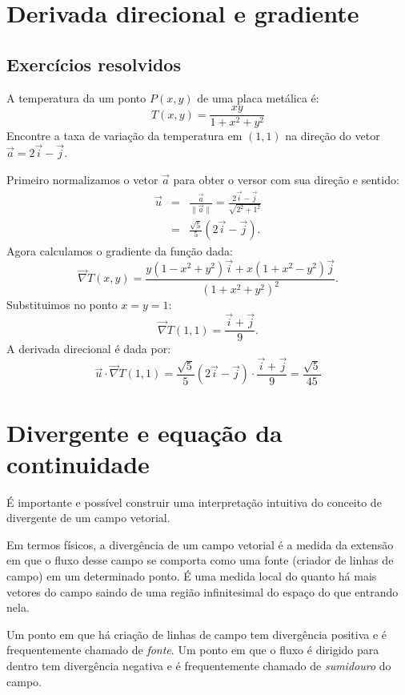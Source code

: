 \section{Derivada direcional e gradiente}


\subsection*{Exercícios resolvidos}
\begin{exeresol}
A temperatura da um ponto $P(x, y)$ de uma placa metálica é:
$$T(x, y) = \frac{xy}{1+x^2+y^2}$$
Encontre a taxa de variação da temperatura em $(1, 1)$ na direção do vetor $\vec{a}=2\vec{i}-\vec{j}$.
\end{exeresol}
\begin{resol}
Primeiro normalizamos o vetor $\vec{a}$ para obter o versor com sua direção e sentido:
\begin{eqnarray*}
\vec{u}&=&\frac{\vec{a}}{\|\vec{a}\|}=\frac{2\vec{i}-\vec{j}}{\sqrt{2^2+1^2}}\\
&=&\frac{\sqrt{5}}{5}\left(2\vec{i}-\vec{j}\right).
\end{eqnarray*}
Agora calculamos o gradiente da função dada:
$$\vec{\nabla}T(x, y) = \frac{y(1-x^2+y^2)\vec{i} + x(1+x^2-y^2)\vec{j}}{\left(1+x^2+y^2\right)^2}.$$
Substituimos no ponto $x=y=1$:
$$\vec{\nabla}T(1, 1) = \frac{\vec{i} + \vec{j}}{9}.$$
A derivada direcional é dada por:
$$\vec{u}\cdot\vec{\nabla}T(1,1) = \frac{\sqrt{5}}{5}\left(2\vec{i}-\vec{j}\right)\cdot \frac{\vec{i} + \vec{j}}{9}=\frac{\sqrt{5}}{45}$$
\end{resol}

\section{Divergente e equação da continuidade}
É importante e possível construir uma interpretação intuitiva do conceito de divergente de um campo vetorial.

Em termos físicos, a divergência de um campo vetorial é a medida da extensão em que o fluxo desse campo se comporta como uma fonte (criador de linhas de campo) em um determinado ponto. É uma medida local do quanto há mais vetores do campo saindo de uma região infinitesimal do espaço do que entrando nela. 

Um ponto em que há criação de linhas de campo tem divergência positiva e é frequentemente chamado de \emph{fonte}. Um ponto em que o fluxo é dirigido para dentro tem divergência negativa e é frequentemente chamado de \emph{sumidouro} do campo. 

